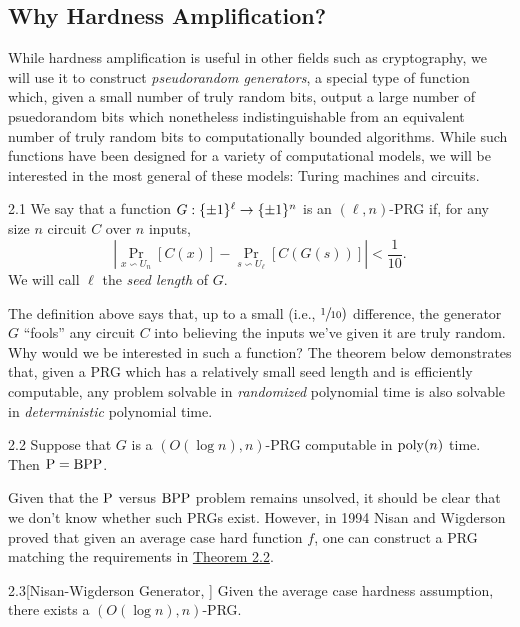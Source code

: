 \documentclass[11pt]{article}
\begin{document}
\subsection{Why Hardness Amplification?}

While hardness amplification is useful in other fields such as cryptography, we will use it to construct \emph{pseudorandom generators}, a special type of function which, given a small number of truly random bits, output a large number of psuedorandom bits which nonetheless indistinguishable from an equivalent number of truly random bits to computationally bounded algorithms. While such functions have been designed for a variety of computational models, we will be interested in the most general of these models: Turing machines and circuits.

\begin{definition}{2.1}
    We say that a function $G : \pmo^\ell \rightarrow \pmo^{n}$ is an $(\ell, n)$-PRG if, for any size $n$ circuit $C$ over $n$ inputs, 
    \begin{equation*}
        \left|\Pr_{x \backsim U_n}[C(x)] - \Pr_{s \backsim U_\ell}[C(G(s))]\right| < \frac{1}{10}.
    \end{equation*}
    We will call $\ell$ the \emph{seed length} of $G$.
\end{definition}

The definition above says that, up to a small (i.e., $\sfrac{1}{10})$ difference, the generator $G$ ``fools'' any circuit $C$ into believing the inputs we've given it are truly random. Why would we be interested in such a function? The theorem below demonstrates that, given a PRG which has a relatively small seed length and is efficiently computable, any problem solvable in \emph{randomized} polynomial time is also solvable in \emph{deterministic} polynomial time.

\begin{theorem}{2.2} \label{t-2-2}
    Suppose that $G$ is a $(O(\log n), n)$-PRG computable in $\poly(n)$ time. Then $\P = \BPP$.
\end{theorem}

Given that the $\P$ versus $\BPP$ problem remains unsolved, it should be clear that we don't know whether such PRGs exist. However, in 1994 Nisan and Wigderson \cite{NW94} proved that given an average case hard function $f$, one can construct a PRG matching the requirements in \hyperref[t-2-2]{Theorem 2.2}.

\begin{theorem}{2.3}[Nisan-Wigderson Generator, \cite{NW94}] \label{t-2-3}
    Given the average case hardness assumption, there exists a $(O(\log n), n)$-PRG.
\end{theorem}
\end{document}
